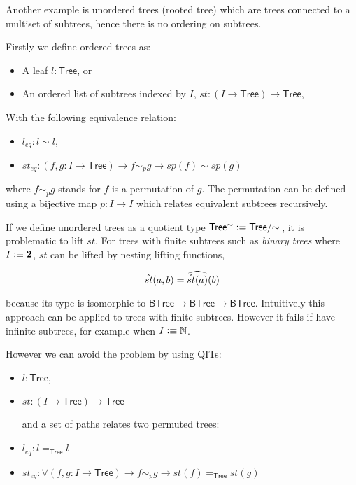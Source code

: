 Another example is unordered trees (rooted tree) which are trees connected to a multiset of subtrees, hence there is no ordering on subtrees.

Firstly we define ordered trees as:

\begin{itemize}
\item A leaf $l: \mathsf{Tree}$, or
\item An ordered list of subtrees indexed by $I$, $st : (I \rightarrow \mathsf{Tree}) \rightarrow \mathsf{Tree}$,
\end{itemize}

With the following equivalence relation:

\begin{itemize}
\item $l_{eq} : l \sim l$,
\item $st_{eq} : (f , g : I \to \mathsf{Tree}) \to f \sim_{p} g \to sp(f) \sim sp(g)$
\end{itemize}

where $f \sim_{p} g$ stands for $f$ is a permutation of $g$. The permutation can be defined using a bijective map $p : I \to I$ which relates equivalent subtrees recursively.


If we define unordered trees as a quotient type $\mathsf{Tree^{\sim}} := \qset{\mathsf{Tree}}$, 
it is problematic to lift $st$.
For trees with finite subtrees such as \emph{binary trees} where $I \vcentcolon\equiv \mathbf{2}$, $st$ can be lifted by nesting lifting functions,

$$\hat{st}(a,b) = \widehat{\hat{st}(a)}(b)$$

because its type is isomorphic to $\mathsf{BTree} \rightarrow \mathsf{BTree} \rightarrow \mathsf{BTree}$.
Intuitively this approach can be applied to trees with finite subtrees. However it fails if have infinite subtrees, for example when $I \vcentcolon\equiv \mathbb{N}$.

However we can avoid the problem by using QITs:

\begin{itemize}
\item $l: \mathsf{Tree}$, 
\item $st : (I \rightarrow \mathsf{Tree}) \rightarrow \mathsf{Tree}$

and a set of paths relates two permuted trees:

\item $l_{eq} : l  =_{\mathsf{Tree}} l $

\item$st_{eq} : \forall (f, g : I \to \mathsf{Tree}) \rightarrow  f \sim_{p} g \rightarrow  st(f) =_{\mathsf{Tree}} st(g)$
\end{itemize}

